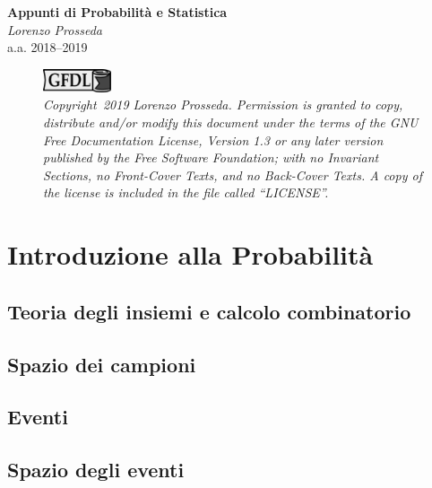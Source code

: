 \documentclass[12pt,openany]{amsbook}
\begin{document}
    \begin{titlepage}
        \centering %
        \Huge\textbf{Appunti di Probabilità e Statistica}\\
        \Large\textit{Lorenzo Prosseda}\\
        \bigskip
        \large a.a. 2018\---2019 \\
        \begin{figure}[h] %
            \includegraphics[width=2cm]{gfdl-logo.pdf}
            \bigskip \\
            \small\textit{Copyright \textcopyright\,2019 Lorenzo Prosseda. Permission is granted to copy, distribute and/or modify this document under the terms of the GNU Free Documentation License, Version 1.3 or any later version published by the Free Software Foundation; with no Invariant Sections, no Front-Cover Texts, and no Back-Cover Texts. A copy of the license is included in the file called ``LICENSE''.}
        \end{figure}
    \end{titlepage}

    \tableofcontents

    \chapter{Introduzione alla Probabilità}
        \section{Teoria degli insiemi e calcolo combinatorio}
        \section{Spazio dei campioni}
        \section{Eventi}
        \section{Spazio degli eventi}
\end{document}
